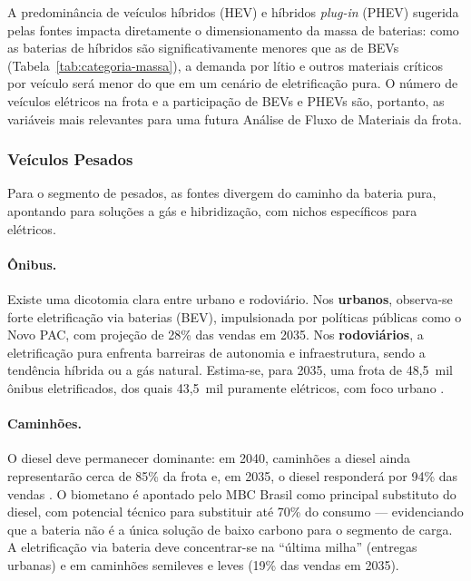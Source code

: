 A predominância de veículos híbridos (HEV) e híbridos \textit{plug-in} (PHEV)
sugerida pelas fontes impacta diretamente o dimensionamento da massa de baterias:
como as baterias de híbridos são significativamente menores que as de BEVs
(Tabela~\ref{tab:categoria-massa}), a demanda por lítio e outros materiais
críticos por veículo será menor do que em um cenário de eletrificação pura. O
número de veículos elétricos na frota e a participação de BEVs e PHEVs são,
portanto, as variáveis mais relevantes para uma futura Análise de Fluxo de
Materiais da frota.

\subsubsection{Veículos Pesados}
\label{subsec:pesados}

Para o segmento de pesados, as fontes divergem do caminho da bateria pura,
apontando para soluções a gás e hibridização, com nichos específicos para
elétricos.

\paragraph{Ônibus.}
Existe uma dicotomia clara entre urbano e rodoviário. Nos \textbf{urbanos},
observa-se forte eletrificação via baterias (BEV), impulsionada por políticas
públicas como o Novo PAC, com projeção de 28\% das vendas em 2035. Nos
\textbf{rodoviários}, a eletrificação pura enfrenta barreiras de autonomia e
infraestrutura, sendo a tendência híbrida ou a gás natural. Estima-se, para 2035,
uma frota de 48,5~mil ônibus eletrificados, dos quais 43,5~mil puramente elétricos,
com foco urbano .

\paragraph{Caminhões.}
O diesel deve permanecer dominante: em 2040, caminhões a diesel ainda
representarão cerca de 85\% da frota e, em 2035, o diesel responderá por 94\% das
vendas . O biometano é apontado
pelo MBC Brasil como principal substituto do diesel, com potencial técnico para
substituir até 70\% do consumo \cite{MBCBrasil} — evidenciando que a bateria não
é a única solução de baixo carbono para o segmento de carga. A eletrificação via
bateria deve concentrar-se na ``última milha'' (entregas urbanas) e em caminhões
semileves e leves (19\% das vendas em 2035).

